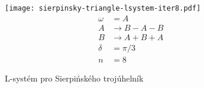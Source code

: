 \begin{figure}[H]
    \centering
    \texttt{[image: sierpinsky-triangle-lsystem-iter8.pdf]}
    \begin{align*}
        \omega&=A\\
        A&\to B-A-B\\
        B&\to A+B+A\\
        \delta&=\pi/3\\
        n&=8
    \end{align*}
    \caption{L-systém pro Sierpińského trojúhelník}
    \label{fig:lsystem-sierpinskeho-trojúhelnik}
\end{figure}